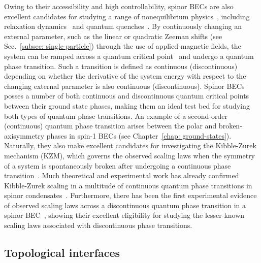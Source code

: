 Owing to their accessibility and high controllability, spinor BECs are also
excellent candidates for studying a range of nonequilibrium
physics~\cite{Schmaljohann2004}, including
relaxation dynamics~\cite{Gring2012, Reeves2022} and quantum
quenches~\cite{Sadler2006,Barnett2011,Navon2015,Symes2017,Kang2017,Prufer2018,
Schmied2019,Liu2020}.
By continuously changing an external parameter, such as the linear or quadratic
Zeeman shifts (see Sec.~\ref{subsec: single-particle}) through the use of
applied magnetic fields, the system can be ramped across a
quantum critical point~\cite{Sachdev2011} and undergo a quantum phase
transition.
Such a transition is defined as continuous (discontinuous) depending on whether
the derivative of the system energy with respect to the changing external
parameter is also continuous (discontinuous).
Spinor BECs posses a number of both continuous and discontinuous quantum
critical points between their ground state phases, making them an ideal test bed
for studying both types of quantum phase transitions.
An example of a second-order (continuous) quantum phase transition arises
between the polar and broken-axisymmetry phases in spin-1 BECs (see
Chapter~\ref{chap: ground-states}).
Naturally, they also make excellent candidates for investigating the
Kibble-Zurek mechanism (KZM), which governs the observed scaling laws when the
symmetry of a system is spontaneously broken after undergoing a continuous phase
transition~\cite{DelCampo2014}.
Much theoretical and experimental work has already confirmed Kibble-Zurek
scaling in a multitude of continuous quantum phase transitions in spinor
condensates~\cite{Sadler2006, Damski2006,Damski2007, Lamacraft2007,Saito2007,
Saito2007a,Vengalattore2008, Swislocki2013, Witkowska2013, Anquez2016,
Williamson2016,Kang2017}.
Furthermore, there has been the first experimental evidence of observed scaling
laws across a discontinuous quantum phase transition in a spinor
BEC~\cite{Qiu2020}, showing their excellent eligibility for studying the
lesser-known scaling laws associated with discontinuous phase transitions.

\subsection{Topological interfaces}

